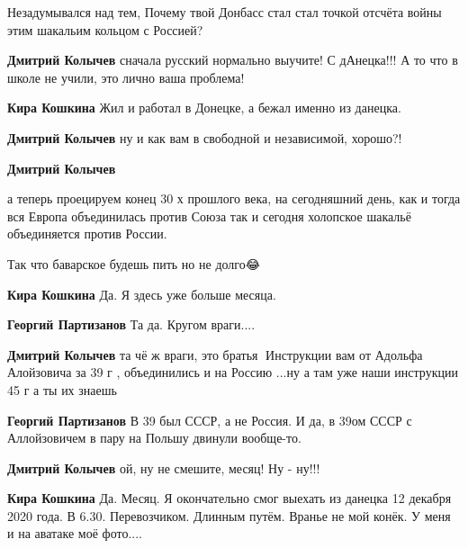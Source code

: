 \begin{itemize}
\begin{itemize}
Незадумывался над тем, Почему твой Донбасс стал стал точкой отсчёта войны этим
шакальим кольцом с Россией?


\textbf{Дмитрий Колычев} сначала русский нормально выучите! С дАнецка!!! А то
что в школе не учили, это лично ваша проблема!

\textbf{Кира Кошкина} Жил и работал в Донецке, а бежал именно из данецка.

\textbf{Дмитрий Колычев} ну и как вам в свободной и независимой, хорошо?!

\textbf{Дмитрий Колычев} 

а теперь проецируем конец 30 х прошлого века, на сегодняшний день, как и тогда
вся Европа объединилась против Союза так и сегодня холопское шакальё
объединяется против России.

Так что баварское будешь пить но не долго😂

\textbf{Кира Кошкина} Да. Я здесь уже больше месяца.

\textbf{Георгий Партизанов} Та да. Кругом враги....

\textbf{Дмитрий Колычев} та чё ж враги, это братья🤣
Инструкции вам от Адольфа Алойзовича за 39 г , объединились и на Россию ...ну а
там уже наши инструкции 45 г а ты их знаешь 🤣🤣🤣🤣

\textbf{Георгий Партизанов} В 39 был СССР, а не Россия. И да, в 39ом СССР с
Аллойзовичем в пару на Польшу двинули вообще-то.


\textbf{Дмитрий Колычев} ой, ну не смешите, месяц! Ну - ну!!!

\textbf{Кира Кошкина} Да. Месяц. Я окончательно смог выехать из данецка 12
декабря 2020 года. В 6.30. Перевозчиком. Длинным путём. Вранье не мой конёк. У
меня и на аватаке моё фото....


\end{itemize}
\end{itemize}
